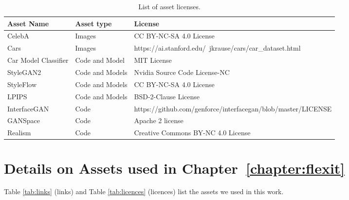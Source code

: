\begin{table*}[h]
\hspace{\sizeforappendix}
\small
\begin{tabular}{lll}
\toprule
\textbf{Asset Name} & \textbf{Asset type} & \textbf{License} \\
\midrule
CelebA & Images & CC BY-NC-SA 4.0 License \\
Cars & Images & https://ai.stanford.edu/~jkrause/cars/car\_dataset.html\\
Car Model Classifier & Code and Model & MIT License \\
StyleGAN2 & Code and Models & Nvidia Source Code License-NC \\
StyleFlow & Code and Models & CC BY-NC-SA 4.0 License \\
LPIPS & Code and Models & BSD-2-Clause License \\
InterfaceGAN & Code & https://github.com/genforce/interfacegan/blob/master/LICENSE \\
GANSpace & Code & Apache 2 license \\
Realism & Code & Creative Commons BY-NC 4.0 License \\
\bottomrule
\end{tabular}
\caption{List of asset licenses.}
\label{tab:licenceschap1}
\end{table*}
        
\pagebreak


\section{Details on Assets used in Chapter~\ref{chapter:flexit}}
\label{sec:FlexIt assets}


Table \ref{tab:links} (links) and Table \ref{tab:licences} (licences)
list the assets we used in this work.


